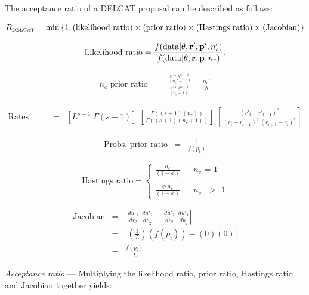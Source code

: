 \documentclass[12pt]{article}
\newcommand{\ncat}{n_c}
\begin{document}
The acceptance ratio of a DELCAT proposal can be described as follows:

\[ R_{\mbox{\tiny DELCAT}} = \min \left\{1, (\mbox{likelihood ratio}) \times (\mbox{prior ratio}) \times (\mbox{Hastings ratio}) \times (\mbox{Jacobian}) \right\} \]

\[ \mbox{Likelihood ratio} = \frac{f(\mbox{data} | {\bf \theta}, {\bf r}', {\bf p}', \ncat')}{f(\mbox{data} | {\bf \theta}, {\bf r}, {\bf p}, \ncat)}. \]

\begin{eqnarray*}
\mbox{$\ncat$ prior ratio} & = & \frac{\frac{e^{-\lambda} \; \lambda^{\ncat' - 1}}{(\ncat' - 1)!}}{\frac{e^{-\lambda} \; \lambda^{\ncat - 1}}{(\ncat - 1)!}} = \frac{\ncat'}{\lambda}
\end{eqnarray*}

\begin{eqnarray*}
\mbox{Rates prior ratio} 
  & = & \left[ L^{s+1} \; \Gamma(s+1)\right] \; 
  \left[ \frac{\Gamma\left( (s+1) (\ncat) \right)}{\Gamma\left( (s+1) (\ncat + 1) \right)} \right] \;
  \left[ \frac{(r'_i - r'_{i-1})^s}{(r_i - r_{i-1})^s \; (r_{i+1} - r_i)^s} \right]
\end{eqnarray*}

\begin{eqnarray*}
\mbox{Probs. prior ratio} & = & \frac{1}{f(p_i)}
\end{eqnarray*}

\[ \mbox{Hastings ratio} = \left\{
  \begin{array}{lcl}
    \frac{\ncat}{(1-\phi)} & & \mbox{$\ncat$ = 1} \\
     & & \\
    \frac{\phi \; \ncat}{(1-\phi)} & & \mbox{$\ncat$ $>$ 1}
  \end{array}
\right. \] 

\begin{eqnarray*}
\mbox{Jacobian} & = & \left| \frac{d u'_1}{d r_2} \; \frac{d u'_2}{d p_2} - \frac{d u'_2}{d r_2} \; \frac{d u'_1}{d p_2} \right| \\
& = & \left| \left( \frac{1}{L} \right) \left( f(p_i) \right) - (0)(0) \right| \\
& = & \frac{f(p_i)}{L}
\end{eqnarray*}

{\em Acceptance ratio} --- Multiplying the likelihood ratio, prior ratio, Hastings ratio and Jacobian together yields:
\end{document}

